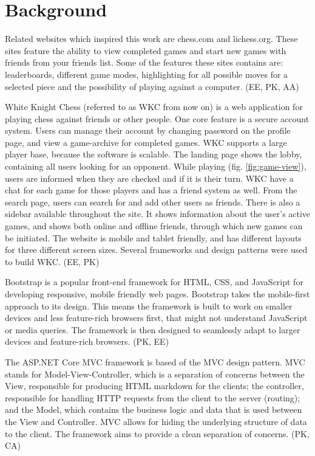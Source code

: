 \documentclass[acmlarge, review=false, screen=true]{acmart}
\begin{document}
\section{Background}
Related websites which inspired this work are chess.com and lichess.org\cite{chess.com, lichess.org}. These sites feature the ability to view completed games and start new games with friends from your friends list. Some of the features these sites contains are: leaderboards, different game modes, highlighting for all possible moves for a selected piece and the possibility of playing against a computer. (EE, PK, AA)

White Knight Chess (referred to as WKC from now on) is a web application for playing chess against friends or other people. One core feature is a secure account system. Users can manage their account by changing password on the profile page, and view a game-archive for completed games. WKC supports a large player base, because the software is scalable. The landing page shows the lobby, containing all users looking for an opponent. While playing (fig. \ref{fig:game-view}), users are informed when they are checked and if it is their turn. WKC have a chat for each game for those players and has a friend system as well. From the search page, users can search for and add other users as friends. There is also a sidebar available throughout the site. It shows information about the user’s active games, and shows both online and offline friends, through which new games can be initiated. The website is mobile and tablet friendly, and has different layouts for three different screen sizes. Several frameworks and design patterns were used to build WKC. (EE, PK)

Bootstrap is a popular front-end framework for HTML, CSS, and JavaScript for developing responsive, mobile friendly web pages\cite{bootstrap}. Bootstrap takes the mobile-first approach to its design\cite{responsive-web-design}. This means the framework is built to work on smaller devices and less feature-rich browsers first, that might not understand JavaScript or media queries. The framework is then designed to seamlessly adapt to larger devices and feature-rich browsers. (PK, EE)

The ASP.NET Core MVC framework is based of the MVC design pattern\cite{aspnet-mvc}. MVC stands for Model-View-Controller, which is a separation of concerns between the View, responsible for producing HTML markdown for the clients; the controller, responsible for handling HTTP requests from the client to the server (routing); and the Model, which contains the business logic and data that is used between the View and Controller. MVC allows for hiding the underlying structure of data to the client. The framework aims to provide a clean separation of concerns. (PK, CA)
\end{document}
